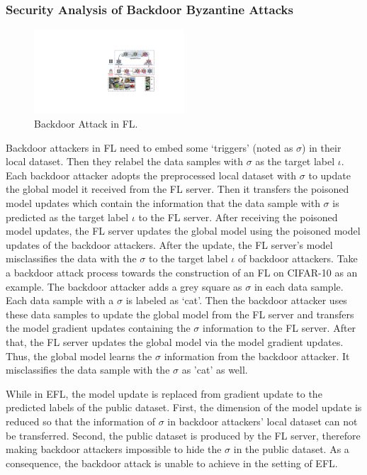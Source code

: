 \documentclass[journal]{IEEEtran}
\begin{document}
\subsubsection{Security Analysis of Backdoor Byzantine Attacks}
\begin{figure}
\centering
\includegraphics[width=0.5\textwidth]{figures/Figure_backdoor.pdf}
\caption{Backdoor Attack in FL.}
\label{fig_backdoor}
\end{figure}
\par Backdoor attackers in FL need to embed some `triggers' (noted as $\sigma$) in their local dataset. Then they relabel the data samples with $\sigma$ as the target label $\iota$. Each backdoor attacker adopts the preprocessed local dataset with $\sigma$ to update the global model it received from the FL server. Then it transfers the poisoned model updates which contain the information that the data sample with $\sigma$ is predicted as the target label $\iota$ to the FL server. After receiving the poisoned model updates, the FL server updates the global model using the poisoned model updates of the backdoor attackers. After the update, the FL server's model misclassifies the data with the $\sigma$ to the target label $\iota$ of backdoor attackers. Take a backdoor attack process towards the construction of an FL on CIFAR-10 as an example. The backdoor attacker adds a grey square as $\sigma$ in each data sample. Each data sample with a $\sigma$ is labeled as `cat'. Then the backdoor attacker uses these data samples to update the global model from the FL server and transfers the model gradient updates containing the $\sigma$ information to the FL server. After that, the FL server updates the global model via the model gradient updates. Thus, the global model learns the $\sigma$ information from the backdoor attacker. It misclassifies the data sample with the $\sigma$ as 'cat' as well.
\par While in EFL, the model update is replaced from gradient update to the predicted labels of the public dataset. First, the dimension of the model update is reduced so that the information of $\sigma$ in backdoor attackers' local dataset can not be transferred. Second, the public dataset is produced by the FL server, therefore making backdoor attackers impossible to hide the $\sigma$ in the public dataset. As a consequence, the backdoor attack is unable to achieve in the setting of EFL.
\end{document}
